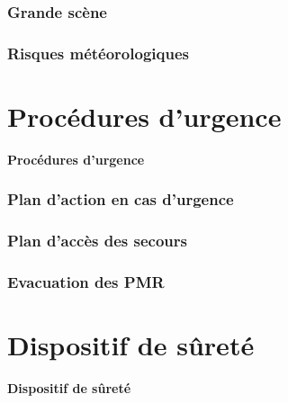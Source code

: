 \documentclass{beamer}
\begin{document}
\begin{frame}

\frametitle{Grande scène}

\end{frame}

\begin{frame}

\frametitle{Risques météorologiques}

\end{frame}


\section{Procédures d'urgence}

\begin{frame}

\centering\Huge{\textbf{Procédures d'urgence}}

\end{frame}

\begin{frame}

\frametitle{Plan d'action en cas d'urgence}

\end{frame}

\begin{frame}

\frametitle{Plan d'accès des secours}

\end{frame}

\begin{frame}

\frametitle{Evacuation des PMR}

\end{frame}


\section{Dispositif de sûreté}

\begin{frame}

\centering\Huge{\textbf{Dispositif de sûreté}}

\end{frame}
\end{document}
